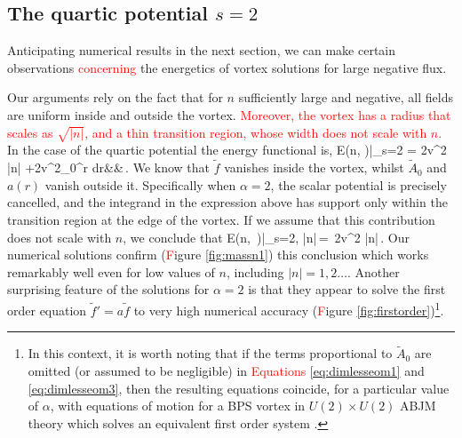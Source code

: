  \subsection{The quartic potential $s=2$}
Anticipating numerical results in the next section, we can make certain  observations \textcolor{red}{concerning} the energetics of vortex solutions for large negative flux. 

Our arguments rely on the fact that for $n$ sufficiently large and negative, all fields are uniform inside and outside the vortex. \textcolor{red}{Moreover, the vortex has a radius that scales as $\sqrt{|n|}$, and a thin transition region, whose width does not scale with $n$.} In the case of the quartic potential the energy functional is, 
\bea
{\cal E}(n, \alpha)\big|_{s=2} = 2\pi v^2 |n| +2\pi v^2\int_0^\infty \tilde r d\tilde r&&\,. 
\eea
We know that $\tilde f$ vanishes inside the vortex, whilst $\tilde A_0$  and $a(r)$ vanish outside it.  Specifically when $\alpha=2$, the scalar potential is precisely cancelled, and the integrand in the expression above has support only within the transition region at the edge of the vortex. If we assume that this  contribution does not scale with $n$, we conclude that
\be
{\cal E}(n, \,)\big|_{s=2, |n|}\,=\, 2\pi v^2 |n|\,.
\ee
Our numerical solutions confirm (\textcolor{red}{F}igure \ref{fig:massn1}) this conclusion which works remarkably well even for low values of $n$, including  $|n|=1,2 \ldots$. Another surprising feature of the solutions for $\alpha=2$ is that they appear to solve the first order equation $\tilde f'= a \tilde f$ to very high numerical accuracy (\textcolor{red}{F}igure \ref{fig:firstorder})\footnote{In this context, it is worth noting that if the terms proportional to $\tilde A_0$ are omitted (or assumed to be negligible) in \textcolor{red}{Equations} \eqref{eq:dimlesseom1} and \eqref{eq:dimlesseom3}, then the resulting equations coincide, for a particular value of $\alpha$, with equations of motion for a BPS vortex in $U(2)\times U(2)$ ABJM theory \textcolor{red}{\cite{Aharony:2008ug}} which solves an equivalent first order system \cite{Auzzi:2009es}.}.


